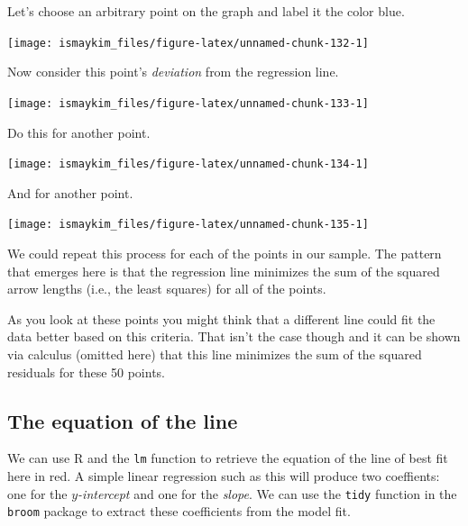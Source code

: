 \documentclass[]{tufte-book}
\newenvironment{Shaded}{\begin{snugshade}}{\end{snugshade}}
\newcommand{\KeywordTok}[1]{\textcolor[rgb]{0.13,0.29,0.53}{\textbf{{#1}}}}
\newcommand{\DataTypeTok}[1]{\textcolor[rgb]{0.13,0.29,0.53}{{#1}}}
\newcommand{\StringTok}[1]{\textcolor[rgb]{0.31,0.60,0.02}{{#1}}}
\newcommand{\NormalTok}[1]{{#1}}
\theoremstyle{definition}
\theoremstyle{definition}
\theoremstyle{remark}
\begin{document}
Let's choose an arbitrary point on the graph and label it the color
blue.

\begin{center}\texttt{[image: ismaykim\_files/figure-latex/unnamed-chunk-132-1]} \end{center}

Now consider this point's \emph{deviation} from the regression line.

\begin{center}\texttt{[image: ismaykim\_files/figure-latex/unnamed-chunk-133-1]} \end{center}

Do this for another point.

\begin{center}\texttt{[image: ismaykim\_files/figure-latex/unnamed-chunk-134-1]} \end{center}

And for another point.

\begin{center}\texttt{[image: ismaykim\_files/figure-latex/unnamed-chunk-135-1]} \end{center}

We could repeat this process for each of the points in our sample. The
pattern that emerges here is that the regression line minimizes the sum
of the squared arrow lengths (i.e., the least squares) for all of the
points.

As you look at these points you might think that a different line could
fit the data better based on this criteria. That isn't the case though
and it can be shown via calculus (omitted here) that this line minimizes
the sum of the squared residuals for these 50 points.

\subsection{The equation of the line}\label{the-equation-of-the-line}

We can use R and the \texttt{lm} function to retrieve the equation of
the line of best fit here in red. A simple linear regression such as
this will produce two coeffients: one for the \emph{\(y\)-intercept} and
one for the \emph{slope}. We can use the \texttt{tidy} function in the
\texttt{broom} package to extract these coefficients from the model fit.

\begin{Shaded}
\end{Shaded}
\end{document}

